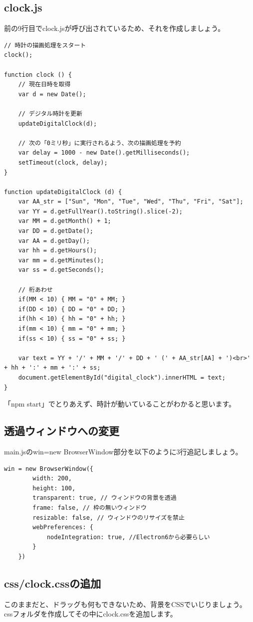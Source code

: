 \documentclass[mingoth,11pt,a4j,uplatex]{jsarticle}
\begin{document}
\subsection{clock.js}
前の9行目でclock.jsが呼び出されているため、それを作成しましょう。
\begin{lstlisting}[caption=DigitalClock：clock.js]
// 時計の描画処理をスタート
clock();

function clock () {
    // 現在日時を取得
    var d = new Date();

    // デジタル時計を更新
    updateDigitalClock(d);

    // 次の「0ミリ秒」に実行されるよう、次の描画処理を予約
    var delay = 1000 - new Date().getMilliseconds();
    setTimeout(clock, delay);
}

function updateDigitalClock (d) {
    var AA_str = ["Sun", "Mon", "Tue", "Wed", "Thu", "Fri", "Sat"];
    var YY = d.getFullYear().toString().slice(-2);
    var MM = d.getMonth() + 1;
    var DD = d.getDate();
    var AA = d.getDay();
    var hh = d.getHours();
    var mm = d.getMinutes();
    var ss = d.getSeconds();

    // 桁あわせ
    if(MM < 10) { MM = "0" + MM; }
    if(DD < 10) { DD = "0" + DD; }
    if(hh < 10) { hh = "0" + hh; }
    if(mm < 10) { mm = "0" + mm; }
    if(ss < 10) { ss = "0" + ss; }

    var text = YY + '/' + MM + '/' + DD + ' (' + AA_str[AA] + ')<br>' + hh + ':' + mm + ':' + ss;
    document.getElementById("digital_clock").innerHTML = text;
}
\end{lstlisting}

「npm start」でとりあえず、時計が動いていることがわかると思います。

\subsection{透過ウィンドウへの変更}
main.jsのwin=new BrowserWindow部分を以下のように3行追記しましょう。

\begin{lstlisting}[caption=DigitalClock：main.js ]
    win = new BrowserWindow({
        width: 200,
        height: 100,
        transparent: true, // ウィンドウの背景を透過
        frame: false, // 枠の無いウィンドウ
        resizable: false, // ウィンドウのリサイズを禁止
        webPreferences: {
            nodeIntegration: true, //Electron6から必要らしい
        }
    })
\end{lstlisting}

\subsection{css/clock.cssの追加}
このままだと、ドラッグも何もできないため、背景をCSSでいじりましょう。
cssフォルダを作成してその中にclock.cssを追加します。
\end{document}
